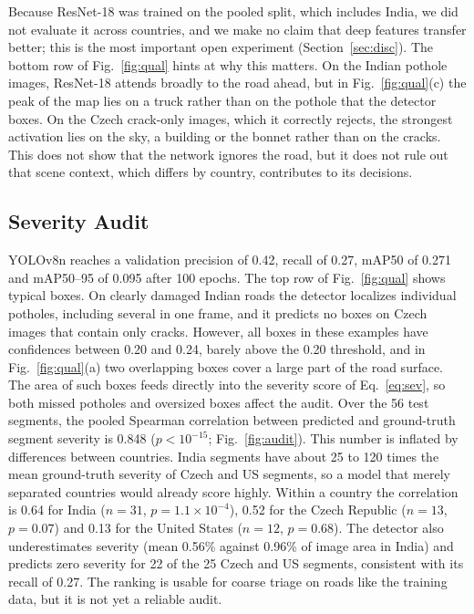 \documentclass[conference]{IEEEtran}
\begin{document}
Because ResNet-18 was trained on the pooled split, which includes India, we did not evaluate it across countries, and we make no claim that deep features transfer better; this is the most important open experiment (Section~\ref{sec:disc}). The bottom row of Fig.~\ref{fig:qual} hints at why this matters. On the Indian pothole images, ResNet-18 attends broadly to the road ahead, but in Fig.~\ref{fig:qual}(c) the peak of the map lies on a truck rather than on the pothole that the detector boxes. On the Czech crack-only images, which it correctly rejects, the strongest activation lies on the sky, a building or the bonnet rather than on the cracks. This does not show that the network ignores the road, but it does not rule out that scene context, which differs by country, contributes to its decisions.



\subsection{Severity Audit}
YOLOv8n reaches a validation precision of 0.42, recall of 0.27, mAP50 of 0.271 and mAP50--95 of 0.095 after 100 epochs. The top row of Fig.~\ref{fig:qual} shows typical boxes. On clearly damaged Indian roads the detector localizes individual potholes, including several in one frame, and it predicts no boxes on Czech images that contain only cracks. However, all boxes in these examples have confidences between 0.20 and 0.24, barely above the 0.20 threshold, and in Fig.~\ref{fig:qual}(a) two overlapping boxes cover a large part of the road surface. The area of such boxes feeds directly into the severity score of Eq.~\eqref{eq:sev}, so both missed potholes and oversized boxes affect the audit. Over the 56 test segments, the pooled Spearman correlation between predicted and ground-truth segment severity is 0.848 ($p<10^{-15}$; Fig.~\ref{fig:audit}). This number is inflated by differences between countries. India segments have about 25 to 120 times the mean ground-truth severity of Czech and US segments, so a model that merely separated countries would already score highly. Within a country the correlation is 0.64 for India ($n=31$, $p=1.1\times10^{-4}$), 0.52 for the Czech Republic ($n=13$, $p=0.07$) and 0.13 for the United States ($n=12$, $p=0.68$). The detector also underestimates severity (mean 0.56\% against 0.96\% of image area in India) and predicts zero severity for 22 of the 25 Czech and US segments, consistent with its recall of 0.27. The ranking is usable for coarse triage on roads like the training data, but it is not yet a reliable audit.
\end{document}
